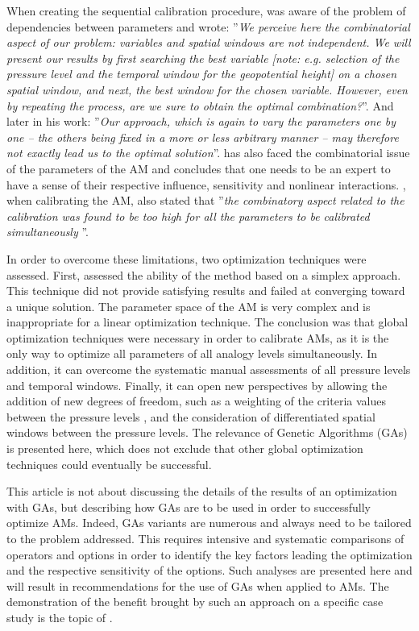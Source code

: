 \documentclass{ametsoc}
\begin{document}
When creating the sequential calibration procedure, \citet{Bontron2004} was aware of the problem of dependencies between parameters and wrote: ''\textit{We perceive here the combinatorial aspect of our problem: variables and spatial windows are not independent. We will present our results by first searching the best variable [note: e.g. selection of the pressure level and the temporal window for the geopotential height] on a chosen spatial window, and next, the best window for the chosen variable. However, even by repeating the process, are we sure to obtain the optimal combination?}''. And later in his work: ''\textit{Our approach, which is again to vary the parameters one by one -- the others being fixed in a more or less arbitrary manner -- may therefore not exactly lead us to the optimal solution}''. \citet{Bliefernicht2010} has also faced the combinatorial issue of the parameters of the AM and concludes that one needs to be an expert to have a sense of their respective influence, sensitivity and nonlinear interactions. \citet{BenDaoud2010}, when calibrating the AM, also stated that ''\textit{the combinatory aspect related to the calibration was found to be too high for all the parameters to be calibrated simultaneously }''.

In order to overcome these limitations, two optimization techniques were assessed. First, \citet{Horton2012a} assessed the ability of the \citet{Nelder1965a} method based on a simplex approach. This technique did not provide satisfying results and failed at converging toward a unique solution. The parameter space of the AM is very complex and is inappropriate for a linear optimization technique. The conclusion was that global optimization techniques were necessary in order to calibrate AMs, as it is the only way to optimize all parameters of all analogy levels simultaneously. In addition, it can overcome the systematic manual assessments of all pressure levels and temporal windows. Finally, it can open new perspectives by allowing the addition of new degrees of freedom, such as a weighting of the criteria values between the pressure levels \citep[see][]{Horton2016b}, and the consideration of differentiated spatial windows between the pressure levels. The relevance of Genetic Algorithms (GAs) is presented here, which does not exclude that other global optimization techniques could eventually be successful. 

This article is not about discussing the details of the results of an optimization with GAs, but describing how GAs are to be used in order to successfully optimize AMs. Indeed, GAs variants are numerous and always need to be tailored to the problem addressed. This requires intensive and systematic comparisons of operators and options in order to identify the key factors leading the optimization and the respective sensitivity of the options. Such analyses are presented here and will result in recommendations for the use of GAs when applied to AMs. The demonstration of the benefit brought by such an approach on a specific case study is the topic of \citet{Horton2016b}. 
\end{document}
